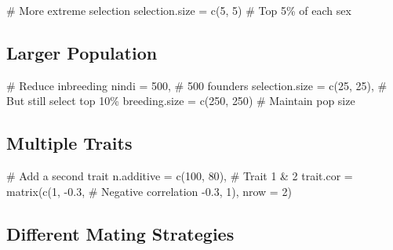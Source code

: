 \documentclass[
  letterpaper,
]{book}
\newenvironment{Shaded}{\begin{snugshade}}{\end{snugshade}}
\newcommand{\AttributeTok}[1]{\textcolor[rgb]{0.40,0.45,0.13}{#1}}
\newcommand{\CommentTok}[1]{\textcolor[rgb]{0.37,0.37,0.37}{#1}}
\newcommand{\DecValTok}[1]{\textcolor[rgb]{0.68,0.00,0.00}{#1}}
\newcommand{\FloatTok}[1]{\textcolor[rgb]{0.68,0.00,0.00}{#1}}
\newcommand{\FunctionTok}[1]{\textcolor[rgb]{0.28,0.35,0.67}{#1}}
\newcommand{\NormalTok}[1]{\textcolor[rgb]{0.00,0.23,0.31}{#1}}
\newcommand{\OtherTok}[1]{\textcolor[rgb]{0.00,0.23,0.31}{#1}}
\newcommand{\SpecialCharTok}[1]{\textcolor[rgb]{0.37,0.37,0.37}{#1}}
\begin{document}
\begin{Shaded}
\begin{Highlighting}[]
\CommentTok{\# More extreme selection}
\NormalTok{selection.size }\OtherTok{=} \FunctionTok{c}\NormalTok{(}\DecValTok{5}\NormalTok{, }\DecValTok{5}\NormalTok{)  }\CommentTok{\# Top 5\% of each sex}
\end{Highlighting}
\end{Shaded}

\subsection{Larger Population}\label{larger-population}

\begin{Shaded}
\begin{Highlighting}[]
\CommentTok{\# Reduce inbreeding}
\NormalTok{nindi }\OtherTok{=} \DecValTok{500}\NormalTok{,                }\CommentTok{\# 500 founders}
\NormalTok{selection.size }\OtherTok{=} \FunctionTok{c}\NormalTok{(}\DecValTok{25}\NormalTok{, }\DecValTok{25}\NormalTok{),  }\CommentTok{\# But still select top 10\%}
\NormalTok{breeding.size }\OtherTok{=} \FunctionTok{c}\NormalTok{(}\DecValTok{250}\NormalTok{, }\DecValTok{250}\NormalTok{)  }\CommentTok{\# Maintain pop size}
\end{Highlighting}
\end{Shaded}

\subsection{Multiple Traits}\label{multiple-traits}

\begin{Shaded}
\begin{Highlighting}[]
\CommentTok{\# Add a second trait}
\NormalTok{n.additive }\OtherTok{=} \FunctionTok{c}\NormalTok{(}\DecValTok{100}\NormalTok{, }\DecValTok{80}\NormalTok{),           }\CommentTok{\# Trait 1 \& 2}
\NormalTok{trait.cor }\OtherTok{=} \FunctionTok{matrix}\NormalTok{(}\FunctionTok{c}\NormalTok{(}\DecValTok{1}\NormalTok{, }\SpecialCharTok{{-}}\FloatTok{0.3}\NormalTok{,      }\CommentTok{\# Negative correlation}
                      \SpecialCharTok{{-}}\FloatTok{0.3}\NormalTok{, }\DecValTok{1}\NormalTok{), }\AttributeTok{nrow =} \DecValTok{2}\NormalTok{)}
\end{Highlighting}
\end{Shaded}

\subsection{Different Mating
Strategies}\label{different-mating-strategies}
\end{document}
